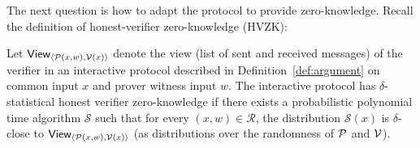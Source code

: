 The next question is how to adapt the \eval protocol to provide zero-knowledge. Recall the definition of honest-verifier zero-knowledge (HVZK):

\begin{definition}
Let $\textsf{View}_{\langle \mathcal{P}(x, w), \mathcal{V}(x) \rangle}$ denote the view (list of sent and received messages) of the verifier in an interactive protocol described in Definition~\ref{def:argument} on common input $x$ and prover witness input $w$. The interactive protocol has $\delta$-statistical honest verifier zero-knowledge if there exists a probabilistic polynomial time algorithm $\mathcal{S}$ such that for every $(x, w) \in \mathcal{R}$, the distribution $\mathcal{S}(x)$ is $\delta$-close to $\textsf{View}_{\langle \mathcal{P}(x, w), \mathcal{V}(x) \rangle}$ (as distributions over the randomness of $\mathcal{P}$ and $\mathcal{V}$).
\end{definition}

